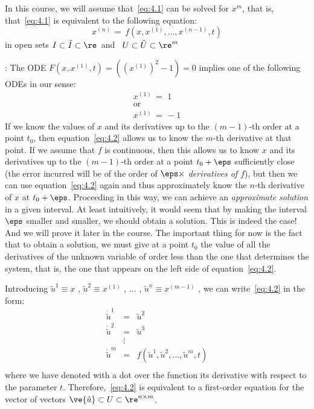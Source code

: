In this course, we will assume that~\ref{eq:4.1} can be solved for $x^m$,
that is, that~\ref{eq:4.1} is equivalent to the following equation:
\begin{equation}
x^{(n)}\,=\,f(x,x^{(1)},\ldots,x^{(n-1)},t)       \label{eq:4.2}
\end{equation}
\noindent in open sets $I\subset\tilde I \subset \re$\  and \ $U\subset
\tilde U \subset \re^m$

\ejem: The ODE $F(x,x^{(1)},t)=((x^{(1)})^2 -1)=0 $ 
implies one of the following ODEs in our sense:
\begin{equation}
\begin{array}{l}
   x^{(1)}\,=\,\,1 \\ 
   \text{or} \\
   x^{(1)}\,=\,-1
\end{array}
\end{equation}
\espa
If we know the values of $x$ and its derivatives up to the $(m-1)$-th
order at a point $t_0$, then equation~\ref{eq:4.2} allows us to
know the $m$-th derivative at that point. 
If we assume that $f$ is continuous, then this allows us to know
$x$ and its derivatives up to the $(m-1)$-th order at a point $t_0+\eps$
sufficiently close (the error incurred will be of the order
of $\eps \times $ {\it derivatives of $f$}), but then we can use
equation~\ref{eq:4.2} again and thus approximately know
the $n$-th derivative of $x$ at $t_0 + \eps$. Proceeding in this way,
we can achieve an {\it approximate solution} in a given interval.
At least intuitively, it would seem that by making the interval $\eps$ smaller and smaller,
we should obtain a solution. This is indeed
the case! And we will prove it later in the course. The important
thing for now is the fact that to obtain a solution, we must
give at a point $t_0$ the value of all the derivatives of the unknown
variable of order less than the one that determines the system, that is, the one
that appears on the left side of equation~\ref{eq:4.2}.



\espa
Introducing $ \tilde{u}^1 \equiv x$ , $\tilde{u}^2\equiv x^{(1)}$ , $\ldots$ ,
$\tilde{u}^n \equiv x^{(m-1)}$ , we can write~\ref{eq:4.2} in the form:
\begin{equation}
\begin{array}{lcl}
   \dot{\tilde{u}}^1&=&\tilde{u}^2 \\
   \dot{\tilde{u}}^2&=&\tilde{u}^3 \\
           &\vdots&  \\
\dot{\tilde{u}}^m&=&f(\tilde{u}^1,\tilde{u}^2,\ldots,\tilde{u}^m,t)\\
   \end{array}
 \end{equation}
\noindent 
where we have denoted with a dot over the function its derivative with
respect to the parameter $t$. 
Therefore,~\ref{eq:4.2} is equivalent to a first-order equation for the vector of vectors 
$\ve{\tilde{u}} \subset U\subset \re^{n \times m}$,

